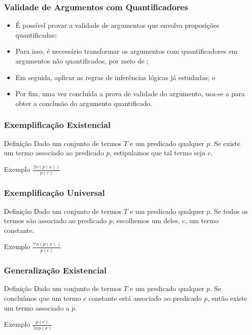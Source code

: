 \documentclass{beamer}
\begin{document}
\begin{frame}
\frametitle{Validade de Argumentos com Quantificadores}

\begin{itemize}
	\item É possível provar a validade de argumentos que envolva proposições quantificadas;
	\item Para isso, é necessário transformar os argumentos com quantificadores em argumentos não quantificados, por meio de ;
	\item Em seguida, aplicar as regras de inferências lógicas já estudadas; e
	\item Por fim, uma vez concluída a prova de validade do argumento, usa-se a  para obter a conclusão do argumento quantificado.
\end{itemize}
\end{frame}

\begin{frame}
\frametitle{Exemplificação Existencial}

\begin{block}{Definição}
Dado um conjunto de termos $T$ e um predicado qualquer $p$. Se existe um termo associado ao predicado $p$, estipulamos que tal termo seja $c$.
\end{block}\vfill

\begin{exampleblock}{Exemplo}
	\Large
	$\frac{\exists x (p(x))}{p(c)}$
\end{exampleblock}
\end{frame}

\begin{frame}
\frametitle{Exemplificação Universal}

\begin{block}{Definição}
Dado um conjunto de termos $T$ e um predicado qualquer $p$. Se todos os termos são associado ao predicado $p$, escolhemos um deles, $c$, um termo
constante.
\end{block}\vfill

\begin{exampleblock}{Exemplo}
	\Large
	$\frac{\forall x (p(x))}{p(c)}$
\end{exampleblock}
\end{frame}

\begin{frame}
\frametitle{Generalização Existencial}

\begin{block}{Definição}
Dado um conjunto de termos $T$ e um predicado qualquer $p$. Se concluímos que um termo $c$ constante está associado ao predicado $p$, então existe um
termo associado a $p$.
\end{block}\vfill

\begin{exampleblock}{Exemplo}
	\Large
	$\frac{p(c)}{ \exists x p(x)}$
\end{exampleblock}
\end{frame}
\end{document}
